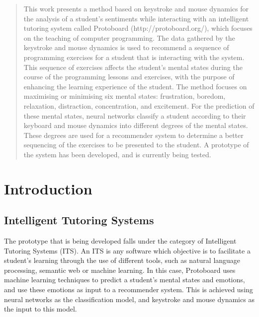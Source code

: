 \documentclass{acm_proc_article-sp}
\begin{document}
\maketitle
\begin{abstract}
This work presents a method based on keystroke and mouse dynamics for
the analysis of a student's sentiments while interacting with an
intelligent tutoring system called Protoboard (http://protoboard.org/), which focuses on the
teaching of computer programming. The data gathered by the keystroke
and mouse dynamics is used to recommend a sequence of programming
exercises for a student that is interacting with the system. This
sequence of exercises affects the student's mental states during
the course of the programming lessons and exercises, with the purpose
of enhancing the learning experience of the student. The method
focuses on maximising or minimising six mental states: frustration,
boredom, relaxation, distraction, concentration, and excitement. For
the prediction of these mental states, neural networks classify a
student according to their keyboard and mouse dynamics into different
degrees of the mental states. These degrees are used for a recommender
system to determine a better sequencing of the exercises to be
presented to the student. A prototype of the system has been
developed, and is currently being tested.
\end{abstract}




\section{Introduction}

\subsection{Intelligent Tutoring Systems}
\label{ITSs}

The prototype that is being developed falls under the category of
Intelligent Tutoring Systems (ITS). An ITS is any software which
objective is to facilitate a student's learning through the use of
different tools, such as natural language processing, semantic web or
machine learning. In this case, Protoboard uses machine learning
techniques to predict a student's mental states and emotions, and use
these emotions as input to a recommender system. This is achieved
using neural networks as the classification model, and keystroke and
mouse dynamics as the input to this model.
\end{document}
